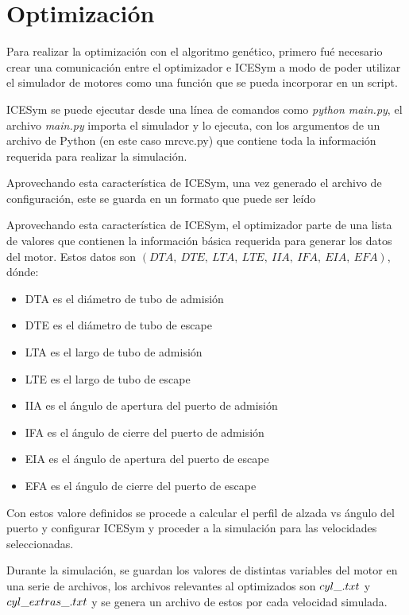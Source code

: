 \chapter{Optimización}

Para realizar la optimización con el algoritmo genético, primero fué necesario
crear una comunicación entre el optimizador e ICESym a modo de poder utilizar
el simulador de motores como una función que se pueda incorporar en un script.

ICESym se puede ejecutar desde una línea de comandos como \emph{python
main.py}, el archivo \emph{main.py} importa el simulador y lo ejecuta, con los
argumentos de un archivo de Python (en este caso mrcvc.py) que contiene toda la
información requerida para realizar la simulación.

Aprovechando esta característica de ICESym, una vez generado el archivo de
configuración, este se guarda en un formato que puede ser leído

Aprovechando esta característica de ICESym, el optimizador parte de una lista de
valores que contienen la información básica requerida para generar los datos del
motor.
%
Estos datos son \emph{$(DTA,\ DTE,\ LTA,\ LTE,\ IIA,\ IFA,\ EIA,\ EFA)$}, dónde:
%
\begin{itemize}
    \item DTA es el diámetro de tubo de admisión
    \item DTE es el diámetro de tubo de escape
    \item LTA es el largo de tubo de admisión
    \item LTE es el largo de tubo de escape
    \item IIA es el ángulo de apertura del puerto de admisión
    \item IFA es el ángulo de cierre del puerto de admisión
    \item EIA es el ángulo de apertura del puerto de escape
    \item EFA es el ángulo de cierre del puerto de escape
\end{itemize}
%

Con estos valore definidos se procede a calcular el perfil de alzada vs ángulo
del puerto y configurar ICESym y proceder a la simulación para las velocidades
seleccionadas.

Durante la simulación, se guardan los valores de distintas variables del motor
en una serie de archivos, los archivos relevantes al optimizados son
\emph{$cyl\_\*.txt$} y \emph{$cyl\_extras\_\*.txt$} y se genera un archivo de
estos por cada velocidad simulada.


